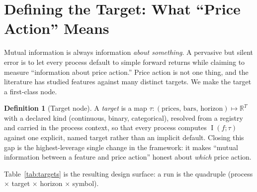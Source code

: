 \documentclass[11pt,a4paper]{article}
\theoremstyle{definition}
\newtheorem{definition}{Definition}[section]
\theoremstyle{plain}
\newcommand{\R}{\mathbb{R}}
\DeclareMathOperator{\MI}{I}
\begin{document}
\section{Defining the Target: What ``Price Action'' Means}
\label{sec:target}

Mutual information is always information \emph{about something}. A pervasive but silent error is to
let every process default to simple forward returns while claiming to measure ``information about
price action.'' Price action is not one thing, and the literature has studied features against many
distinct targets. We make the target a first-class node.

\begin{definition}[Target node]
A \emph{target} is a map $\tau:(\text{prices},\,\text{bars},\,\text{horizon})\mapsto \R^{T}$ with a
declared kind (continuous, binary, categorical), resolved from a registry and carried in the process
context, so that every process computes $\MI(f;\tau)$ against one explicit, named target rather than
an implicit default. Closing this gap is the highest-leverage single change in the framework: it
makes ``mutual information between a feature and price action'' honest about \emph{which} price
action.
\end{definition}

Table~\ref{tab:targets} is the resulting design surface: a run is the quadruple
(process $\times$ target $\times$ horizon $\times$ symbol).
\end{document}
